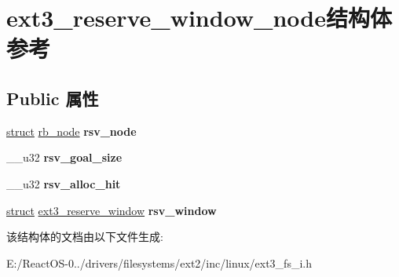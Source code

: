 \hypertarget{structext3__reserve__window__node}{}\section{ext3\+\_\+reserve\+\_\+window\+\_\+node结构体 参考}
\label{structext3__reserve__window__node}
\subsection*{Public 属性}
\begin{DoxyCompactItemize}
\item 
\mbox{\label{structext3__reserve__window__node_a393935652ac222506f3b827eabea91b7}} 
\hyperlink{interfacestruct}{struct} \hyperlink{structrb__node}{rb\+\_\+node} {\bfseries rsv\+\_\+node}
\item 
\mbox{\label{structext3__reserve__window__node_a2f1cf9e59b7b85f99284579f64c32ed8}} 
\+\_\+\+\_\+u32 {\bfseries rsv\+\_\+goal\+\_\+size}
\item 
\mbox{\label{structext3__reserve__window__node_a8574f9796199543c738174b733c60aaa}} 
\+\_\+\+\_\+u32 {\bfseries rsv\+\_\+alloc\+\_\+hit}
\item 
\mbox{\label{structext3__reserve__window__node_a1c51f5429d72cba81118d9b1f34ecb7f}} 
\hyperlink{interfacestruct}{struct} \hyperlink{structext3__reserve__window}{ext3\+\_\+reserve\+\_\+window} {\bfseries rsv\+\_\+window}
\end{DoxyCompactItemize}


该结构体的文档由以下文件生成\+:\begin{DoxyCompactItemize}
\item 
E\+:/\+React\+O\+S-\/0../drivers/filesystems/ext2/inc/linux/ext3\+\_\+fs\+\_\+i.\+h\end{DoxyCompactItemize}
